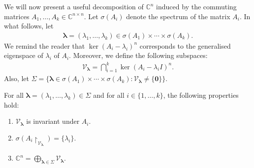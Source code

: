 We will now present a useful decomposition of $\mathbb{C}^{n}$ induced by the commuting matrices $A_{1}, \ldots, A_{k} \in \mathbb{C}^{n \times n}$. Let $\sigma(A_{i})$ denote the spectrum of the matrix $A_{i}$. In what follows, let
\begin{align*}
\boldsymbol{\lambda} = (\lambda_{1}, \ldots, \lambda_{k}) \in \sigma(A_{1}) \times \cdots \times \sigma(A_{k}) .
\end{align*}
We remind the reader that $\ker(A_{i} - \lambda_{i})^{n}$ corresponds to the generalised eigenspace of $\lambda_{i}$ of $A_{i}$. Moreover, we define the following subspaces:
\begin{align*}
\mathcal{V}_{\boldsymbol{\lambda}} = \bigcap \limits_{i=1}^{k} \ker(A_{i} - \lambda_{i} I)^{n}.
\end{align*}
Also, let $\Sigma = \lbrace \boldsymbol{\lambda} \in \sigma(A_{1}) \times \cdots \times \sigma(A_{k}) : \mathcal{V}_{\boldsymbol{\lambda}} \neq \lbrace \boldsymbol{0} \rbrace \rbrace$.

\begin{theorem}
\label{subspace_decomposition}
For all $\boldsymbol{\lambda} = (\lambda_{1}, \ldots, \lambda_{k}) \in \Sigma$ and for all $i \in \lbrace 1, \ldots, k \rbrace$, the following properties hold:

\begin{enumerate}

\item $\mathcal{V}_{\boldsymbol{\lambda}}$ is invariant under $A_{i}$.

\item $\sigma(A_{i} \restriction_{\mathcal{V}_{\boldsymbol{\lambda}}}) = \lbrace \lambda_{i} \rbrace$.

\item $\mathbb{C}^{n} = \bigoplus \limits_{\boldsymbol{\lambda} \in \Sigma} \mathcal{V}_{\boldsymbol{\lambda}} .$

\end{enumerate}
\end{theorem}

